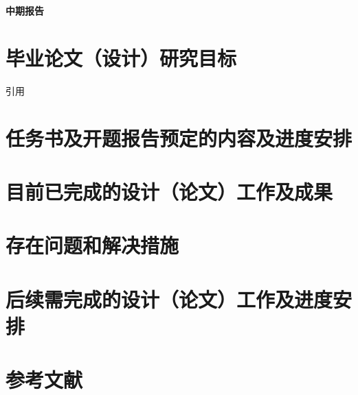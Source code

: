 \cleardoublepage
\begin{center}
     \textbf{中期报告}
\end{center}
    
\section{毕业论文（设计）研究目标}

引用

\section{任务书及开题报告预定的内容及进度安排}

\section{目前已完成的设计（论文）工作及成果}

\section{存在问题和解决措施}

\section{后续需完成的设计（论文）工作及进度安排}

\newpage

\section{参考文献}
{\normalfont{}\setlength{\baselineskip}{14pt}
\renewcommand{\refname}{\vspace{-\baselineskip}}
}